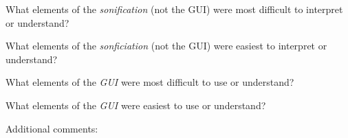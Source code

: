 \documentclass[12pt]{exam}
\begin{document}
\begin{questions}
\newpage
\question What elements of the \emph{sonification} (not the GUI) were most difficult to interpret or understand?

\question What elements of the \emph{sonficiation} (not the GUI) were easiest to interpret or understand?
\newpage

\newpage
\question What elements of the \emph{GUI} were most difficult to use or understand?

\question What elements of the \emph{GUI} were easiest to use or understand?
\newpage

\question Additional comments:
\newpage

\end{questions}
\end{document}
